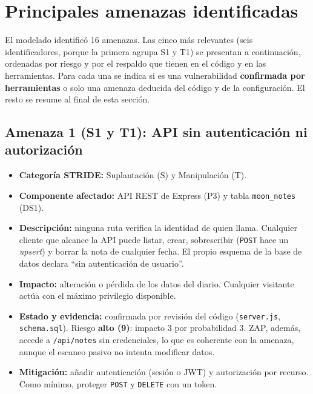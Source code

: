 \section{Principales amenazas identificadas}

El modelado identificó 16 amenazas. Las cinco más relevantes (seis
identificadores, porque la primera agrupa S1 y T1) se presentan a
continuación, ordenadas por riesgo y por el respaldo que tienen en el código
y en las herramientas. Para cada una se indica si es una vulnerabilidad
\textbf{confirmada por herramientas} o solo una amenaza deducida del código y
de la configuración. El resto se resume al final de esta sección.


\subsection{Amenaza 1 (S1 y T1): API sin autenticación ni autorización}

\begin{itemize}
    \item \textbf{Categoría STRIDE:} Suplantación (S) y Manipulación (T).
    \item \textbf{Componente afectado:} API REST de Express (P3) y tabla
    \texttt{moon\_notes} (DS1).
    \item \textbf{Descripción:} ninguna ruta verifica la identidad de quien
    llama. Cualquier cliente que alcance la API puede listar, crear,
    sobrescribir (\texttt{POST} hace un \textit{upsert}) y borrar la nota de
    cualquier fecha. El propio esquema de la base de datos declara ``sin
    autenticación de usuario''.
    \item \textbf{Impacto:} alteración o pérdida de los datos del diario.
    Cualquier visitante actúa con el máximo privilegio disponible.
    \item \textbf{Estado y evidencia:} confirmada por revisión del código
    (\texttt{server.js}, \texttt{schema.sql}). Riesgo \textbf{alto (9)}:
    impacto 3 por probabilidad 3. ZAP, además, accede a \texttt{/api/notes}
    sin credenciales, lo que es coherente con la amenaza, aunque el escaneo
    pasivo no intenta modificar datos.
    \item \textbf{Mitigación:} añadir autenticación (sesión o JWT) y
    autorización por recurso. Como mínimo, proteger \texttt{POST} y
    \texttt{DELETE} con un token.
\end{itemize}

